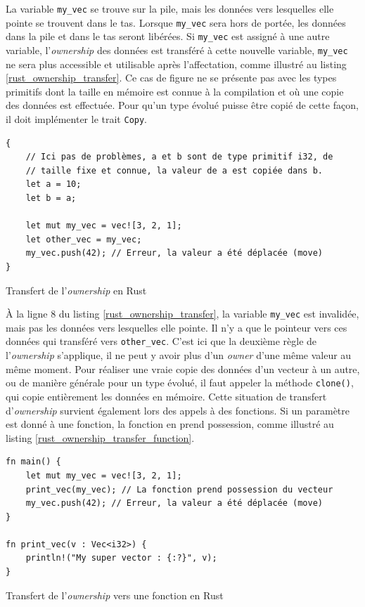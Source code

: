 \bigbreak
La variable \texttt{my_vec} se trouve sur la pile, mais les données vers lesquelles elle 
pointe se trouvent dans le tas. Lorsque \texttt{my_vec} sera hors de portée, les données 
dans la pile et dans le tas seront libérées. Si \texttt{my_vec} est assigné à une autre 
variable, l'\textit{ownership} des données est transféré à cette nouvelle variable, 
\texttt{my_vec} ne sera plus accessible et utilisable après l'affectation, comme illustré
au listing \ref{rust_ownership_transfer}. Ce cas de figure ne se présente pas avec les types primitifs 
dont la taille en mémoire est connue à la compilation et où une copie des données est effectuée. 
Pour qu'un type évolué puisse être copié de cette façon, il doit implémenter le trait \texttt{Copy}.
\bigbreak
\begin{code}
    \begin{verbatim}
{
    // Ici pas de problèmes, a et b sont de type primitif i32, de
    // taille fixe et connue, la valeur de a est copiée dans b.
    let a = 10;
    let b = a;

    let mut my_vec = vec![3, 2, 1]; 
    let other_vec = my_vec;
    my_vec.push(42); // Erreur, la valeur a été déplacée (move)
}
    \end{verbatim}
    \caption{Transfert de l'\textit{ownership} en Rust}
    \label{rust_ownership_transfer}
\end{code}
\bigbreak
À la ligne 8 du listing \ref{rust_ownership_transfer}, la variable \texttt{my_vec} est 
invalidée, mais pas les données vers lesquelles elle pointe. Il n'y a que le pointeur vers ces données 
qui transféré vers \texttt{other_vec}. C'est ici que la deuxième règle de l'\textit{ownership} 
s'applique, il ne peut y avoir plus d'un \textit{owner} d'une même valeur au même moment. 
Pour réaliser une vraie copie des données d'un vecteur à un autre, ou de manière générale pour un 
type évolué, il faut appeler la méthode \texttt{clone()}, qui copie entièrement les 
données en mémoire. Cette situation de transfert d'\textit{ownership} survient également lors des 
appels à des fonctions. Si un paramètre est donné à une fonction, la fonction en prend possession, 
comme illustré au listing \ref{rust_ownership_transfer_function}.
\bigbreak
\begin{code}
    \begin{verbatim}
fn main() {
    let mut my_vec = vec![3, 2, 1]; 
    print_vec(my_vec); // La fonction prend possession du vecteur
    my_vec.push(42); // Erreur, la valeur a été déplacée (move)
}

fn print_vec(v : Vec<i32>) {
    println!("My super vector : {:?}", v);
}
    \end{verbatim}
    \caption{Transfert de l'\textit{ownership} vers une fonction en Rust}
    \label{rust_ownership_transfer_function}
\end{code}
